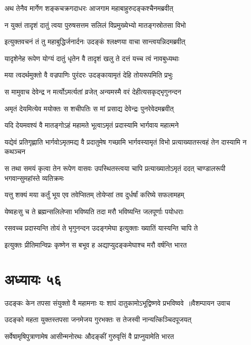 \twolineshloka
{अथ तेनैव मार्गेण शङ्कचक्रगदाधरः}
{आजगाम महाबाहुरुदङ्कश्चैनमब्रवीत्}


\twolineshloka
{न युक्तं तादृशं दातुं त्वया पुरुषसत्तम}
{सलिलं विप्रमुख्येभ्यो मातङ्गस्रोतसा विभो}


\twolineshloka
{इत्युक्तवचनं तं तु महाबुद्धिर्जनार्दनः}
{उदङ्कं श्लक्ष्णया वाचा सान्त्वयन्निदमब्रवीत्}


\twolineshloka
{यादृशेनेह रूपेण योग्यं दातुं धृतेन वै}
{तादृशं खलु ते दत्तं यच्च त्वं नावबुध्यथाः}


\twolineshloka
{मया त्वदर्थमुक्तो वै वज्रपाणिः पुरंदरः}
{उदङ्कायामृतं देहि तोयरूपमिति प्रभुः}


\twolineshloka
{स मामुवाच देवेन्द्र न मर्त्योऽमर्त्यतां व्रजेत्}
{अन्यमस्मै वरं देहीत्यसकृद्भृगुनन्दन}


\twolineshloka
{अमृतं देयमित्येव मयोक्तः स शचीपतिः}
{स मां प्रसाद्य देवेन्द्रः पुनरेवेदमब्रवीत्}


\twolineshloka
{यदि देयमवश्यं वै मातङ्गोऽहं महामते}
{भूत्वाऽमृतं प्रदास्यामि भार्गवाय महात्मने}


\threelineshloka
{यद्येवं प्रतिगृह्णाति भार्गवोऽमृतमद्य वै}
{प्रदातुमेष गच्छामि भार्गवस्यामृतं विभो}
{प्रत्याख्यातस्त्वहं तेन दास्यामि न कथञ्चन}


\threelineshloka
{स तथा समयं कृत्वा तेन रूपेण वासवः}
{उपस्थितस्त्वया चापि प्रत्याख्यातोऽमृतं ददत्}
{चाण्डालरूपी भगवान्सुमहांस्ते व्यतिक्रमः}


\twolineshloka
{यत्तु शक्यं मया कर्तुं भूय एव तवेप्सितम्}
{तोयेप्सां तव दुर्धर्षां करिष्ये सफलामहम्}


\twolineshloka
{येष्वहःसु च ते ब्रह्मन्सलिलेप्सा भविष्यति}
{तदा मरौ भविष्यन्ति जलपूर्णाः पयोधराः}


\twolineshloka
{रसवच्च प्रदास्यन्ति तोयं ते भृगुनन्दन}
{उदङ्गमेघा इत्युक्ताः ख्यातिं यास्यन्ति चापि ते}


\twolineshloka
{इत्युक्तः प्रीतिमान्विप्रः कृष्णेन स बभूव ह}
{अद्याप्युदङ्कमेघाश्च मरौ वर्षन्ति भारत}


\chapter{अध्यायः ५६}
\threelineshloka
{उदङ्कः केन तपसा संयुक्तो वै महामनाः}
{यः शापं दातुकामोऽभूद्विष्णवे प्रभविष्ववे ॥वैशम्पायन उवाच}
{}


\twolineshloka
{उदङ्को महता युक्तस्तपसा जनमेजय}
{गुरभक्तः स तेजस्वी नान्यत्किञ्चिदपूजयत्}


\twolineshloka
{सर्वेषामृषिपुत्राणामेष आसीन्मनोरथः}
{औदङ्कीं गुरुवृत्तिं वै प्राप्नुयामेति भारत}


